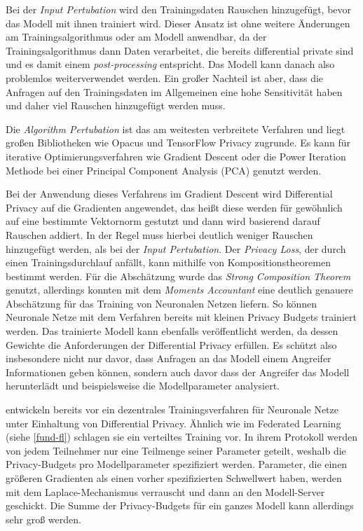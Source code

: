 Bei der \textit{Input Pertubation} wird den Trainingsdaten Rauschen hinzugefügt, bevor das Modell mit ihnen trainiert wird. Dieser Ansatz ist ohne weitere Änderungen am Trainingsalgorithmus oder am Modell anwendbar, da der Trainingsalgorithmus dann Daten verarbeitet, die bereits differential private sind und es damit einem \textit{post-processing} entspricht. Das Modell kann danach also problemlos weiterverwendet werden. Ein großer Nachteil ist aber, dass die Anfragen auf den Trainingsdaten im Allgemeinen eine hohe Sensitivität haben und daher viel Rauschen hinzugefügt werden muss.

Die \textit{Algorithm Pertubation} ist das am weitesten verbreitete Verfahren und liegt großen Bibliotheken wie Opacus \cite{yousefpour:2021} und TensorFlow Privacy \cite{tfprivacy} zugrunde. Es kann für iterative Optimierungsverfahren wie Gradient Descent oder die Power Iteration Methode bei einer Principal Component Analysis (PCA) genutzt werden.

Bei der Anwendung dieses Verfahrens im Gradient Descent wird Differential Privacy auf die Gradienten angewendet, das heißt diese werden für gewöhnlich auf eine bestimmte Vektornorm gestutzt und dann wird basierend darauf Rauschen addiert. In der Regel muss hierbei deutlich weniger Rauschen hinzugefügt werden, als bei der \textit{Input Pertubation}.\cite{chang:2023} Der \textit{Privacy Loss}, der durch einen Trainingsdurchlauf anfällt, kann mithilfe von Kompositionstheoremen bestimmt werden. Für die Abschätzung wurde das \textit{Strong Composition Theorem}\cite{dwork:2010} genutzt, allerdings konnten \textcite{abadi:2016} mit dem \textit{Moments Accountant} eine deutlich genauere Abschätzung für das Training von Neuronalen Netzen liefern. So können Neuronale Netze mit dem Verfahren bereits mit kleinen Privacy Budgets trainiert werden. Das trainierte Modell kann ebenfalls veröffentlicht werden, da dessen Gewichte die Anforderungen der Differential Privacy erfüllen. Es schützt also insbesondere nicht nur davor, dass Anfragen an das Modell einem Angreifer Informationen geben können, sondern auch davor dass der Angreifer das Modell herunterlädt und beispielsweise die Modellparameter analysiert.

\textcite{shokri:2015} entwickeln bereits vor \textcite{abadi:2016} ein dezentrales Trainingsverfahren für Neuronale Netze unter Einhaltung von Differential Privacy. Ähnlich wie im Federated Learning (siehe \autoref{fund-fl}) schlagen sie ein verteiltes Training vor. In ihrem Protokoll werden von jedem Teilnehmer nur eine Teilmenge seiner Parameter geteilt, weshalb die Privacy-Budgets pro Modellparameter spezifiziert werden. Parameter, die einen größeren Gradienten als einen vorher spezifizierten Schwellwert haben, werden mit dem Laplace-Mechanismus verrauscht und dann an den Modell-Server geschickt. Die Summe der Privacy-Budgets für ein ganzes Modell kann allerdings sehr groß werden\cite[p.10]{abadi:2016}.

